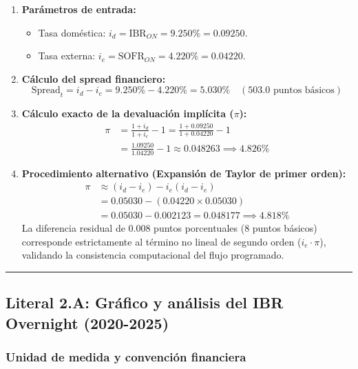 \documentclass[
  10pt,
  letterpaper,
  DIV=11,
  numbers=noendperiod]{scrartcl}
\providecommand{\tightlist}{%
  \setlength{\itemsep}{0pt}\setlength{\parskip}{0pt}}
\begin{document}
\begin{enumerate}
\def\labelenumi{\arabic{enumi}.}
\item
  \textbf{Parámetros de entrada:}

  \begin{itemize}
  \tightlist
  \item
    Tasa doméstica: \(i_d = \text{IBR}_{ON} = 9.250\% = 0.09250\).
  \item
    Tasa externa: \(i_e = \text{SOFR}_{ON} = 4.220\% = 0.04220\).
  \end{itemize}
\item
  \textbf{Cálculo del spread financiero:}
  \[\text{Spread}_t = i_d - i_e = 9.250\% - 4.220\% = 5.030\% \quad (503.0 \text{ puntos básicos})\]
\item
  \textbf{Cálculo exacto de la devaluación implícita (\(\pi\)):}
  \[\begin{aligned}
  \pi &= \frac{1 + i_d}{1 + i_e} - 1 = \frac{1 + 0.09250}{1 + 0.04220} - 1 \\
  &= \frac{1.09250}{1.04220} - 1 \approx 0.048263 \implies 4.826\%
  \end{aligned}\]
\item
  \textbf{Procedimiento alternativo (Expansión de Taylor de primer
  orden):} \[\begin{aligned}
  \pi &\approx (i_d - i_e) - i_e(i_d - i_e) \\
  &= 0.05030 - (0.04220 \times 0.05030) \\
  &= 0.05030 - 0.002123 = 0.048177 \implies 4.818\%
  \end{aligned}\] La diferencia residual de 0.008 puntos porcentuales (8
  puntos básicos) corresponde estrictamente al término no lineal de
  segundo orden (\(i_e \cdot \pi\)), validando la consistencia
  computacional del flujo programado.
\end{enumerate}

\begin{center}\rule{0.5\linewidth}{0.5pt}\end{center}

\subsection{Literal 2.A: Gráfico y análisis del IBR Overnight
(2020-2025)}\label{literal-2.a-gruxe1fico-y-anuxe1lisis-del-ibr-overnight-2020-2025}

\subsubsection{Unidad de medida y convención
financiera}\label{unidad-de-medida-y-convenciuxf3n-financiera}
\end{document}
